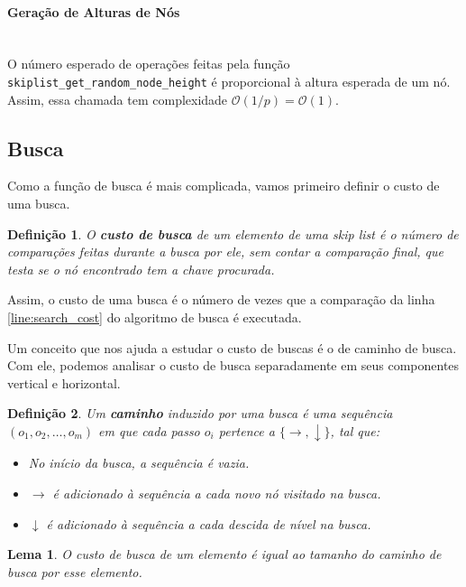 \documentclass[paper=a4, fontsize=11pt]{scrartcl} %
\newtheorem{definition}{Definição}
\newtheorem{lemma}[theorem]{Lema}
\numberwithin{equation}{section}
\numberwithin{figure}{section}
\numberwithin{table}{section}
\numberwithin{definition}{section}
\numberwithin{theorem}{section}
\numberwithin{property}{section}
\numberwithin{proposition}{section}
\newcommand{\cO}{\ensuremath{\mathcal{O}}}
\renewcommand{\sl}{\textit{skip list}\xspace}
\begin{document}
\paragraph{Geração de Alturas de Nós}
\ \\
O número esperado de operações feitas pela função \verb|skiplist_get_random_node_height| é proporcional à 
altura esperada de um nó. Assim, essa chamada tem complexidade $\cO(1/p) = \cO(1)$.

\subsection{Busca}

Como a função de busca é mais complicada, vamos primeiro definir o custo de uma busca.

\begin{definition}

O \textbf{custo de busca} de um elemento de uma \sl é o número de comparações feitas durante a busca por ele, sem
contar a comparação final, que testa se o nó encontrado tem a chave procurada.

\end{definition}

Assim, o custo de uma busca é o número de vezes que a comparação da linha \ref{line:search_cost} do algoritmo
de busca é executada.

Um conceito que nos ajuda a estudar o custo de buscas é o de caminho de busca. Com ele, podemos analisar o
custo de busca separadamente em seus componentes vertical e horizontal.

\begin{definition}

Um \textbf{caminho} induzido por uma busca é uma sequência $(o_1, o_2, \ldots, o_m)$ 
em que cada passo $o_i$ pertence a $\{\rightarrow, \downarrow\}$, tal que:

\begin{itemize}[noitemsep]
  \item No início da busca, a sequência é vazia.
  \item $\rightarrow$ é adicionado à sequência a cada novo nó visitado na busca.
  \item $\downarrow$ é adicionado à sequência a cada descida de nível na busca.
\end{itemize}

\end{definition}

\begin{lemma} \label{lemma:custo_busca_caminho}
O custo de busca de um elemento é igual ao tamanho do caminho de busca por esse elemento.
\end{lemma}
\end{document}

